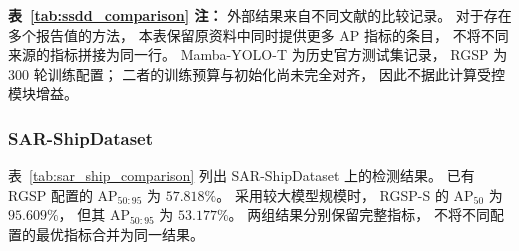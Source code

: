 \noindent
\smallskip
\begin{minipage}{\linewidth}
\footnotesize
\textbf{表~\ref{tab:ssdd_comparison} 注：}
外部结果来自不同文献的比较记录。
对于存在多个报告值的方法，
本表保留原资料中同时提供更多 AP 指标的条目，
不将不同来源的指标拼接为同一行。
Mamba-YOLO-T 为历史官方测试集记录，
RGSP 为 300 轮训练配置；
二者的训练预算与初始化尚未完全对齐，
因此不据此计算受控模块增益。
\end{minipage}
\endgroup
\FloatBarrier


\subsubsection{SAR-ShipDataset}
\label{sec:sar_ship_results}

表~\ref{tab:sar_ship_comparison}
列出 SAR-ShipDataset 上的检测结果。
已有 RGSP 配置的 AP$_{50:95}$ 为 $57.818\%$。
采用较大模型规模时，
RGSP-S 的 AP$_{50}$ 为 $95.609\%$，
但其 AP$_{50:95}$ 为 $53.177\%$。
两组结果分别保留完整指标，
不将不同配置的最优指标合并为同一结果。

